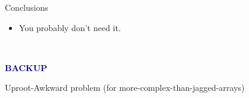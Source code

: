 \documentclass[aspectratio=169]{beamer}
\begin{document}
\begin{frame}{Conclusions}
\large
\begin{itemize}
\item You probably don't need it.
\end{itemize}
\end{frame}

\begin{frame}{\mbox{ }}
\Huge
\begin{center}
\textcolor{darkblue}{\bf BACKUP}
\end{center}
\end{frame}

\begin{frame}{Uproot-Awkward problem (for more-complex-than-jagged-arrays)}
\vspace{0.25 cm}
\end{frame}
\end{document}
